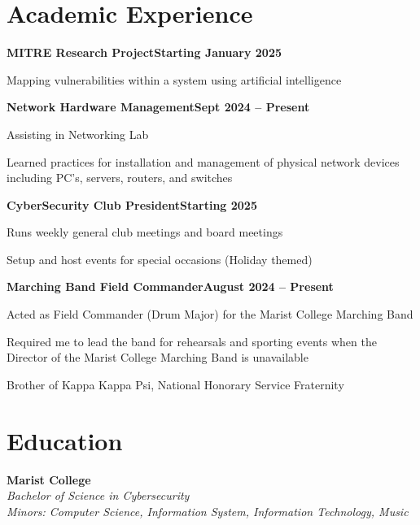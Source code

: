 \documentclass[letterpaper,10pt]{article}
\newcommand{\heading}[2]{
  \hspace{10pt}#1\hfill#2\\
}
\newcommand{\headingBf}[2]{
  \heading{\textbf{#1}}{\textbf{#2}}
}
\newcommand{\headingIt}[2]{
  \heading{\textit{#1}}{\textit{#2}}
}
\newenvironment{resume_list}{
  \vspace{-7pt}
  \begin{itemize}[itemsep=-2px, parsep=1pt, leftmargin=30pt]
}{
  \end{itemize}
}
\begin{document}
  \section{Academic Experience}

  \headingBf{MITRE Research Project}{Starting January 2025}
  \begin{resume_list}
    \item Mapping vulnerabilities within a system using artificial intelligence
  \end{resume_list}

  \headingBf{Network Hardware Management}{Sept 2024 -- Present}
  \begin{resume_list}
    \item Assisting in Networking Lab 
    \item Learned practices for installation and management of physical network devices including PC’s, servers, routers, and switches 
  \end{resume_list}

   \headingBf{CyberSecurity Club President}{Starting 2025}
  \begin{resume_list}
        \item Runs weekly general club meetings and board meetings
        \item Setup and host events for special occasions (Holiday themed)
  \end{resume_list}

   \headingBf{Marching Band Field Commander}{August 2024 -- Present}
  \begin{resume_list}
      \item Acted as Field Commander (Drum Major) for the Marist College Marching Band  
    \item Required me to lead the band for rehearsals and sporting events when the Director of the Marist College Marching Band is unavailable  
    \item Brother of Kappa Kappa Psi, National Honorary Service Fraternity 
  \end{resume_list}


  \section{Education}

  \headingBf{Marist College}{} %
  \headingIt{Bachelor of Science in Cybersecurity}{}
  \headingIt{Minors: Computer Science, Information System, Information Technology, Music}{}
\end{document}
